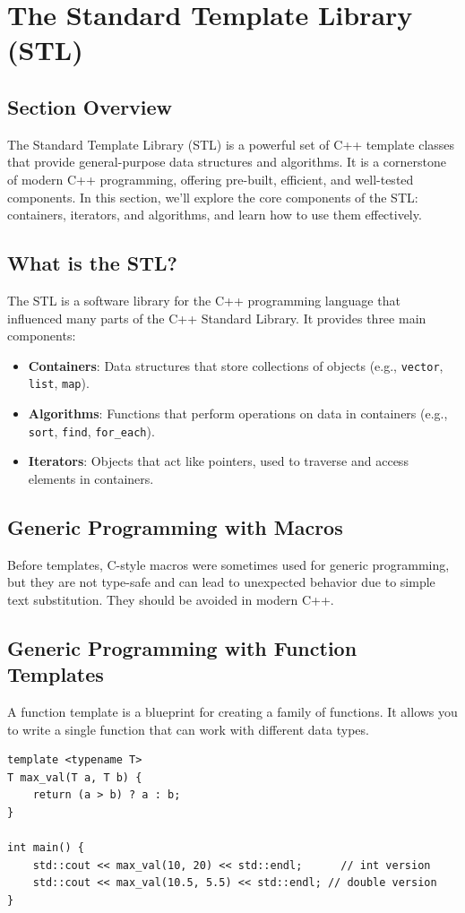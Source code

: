 \section{The Standard Template Library (STL)}

\subsection{Section Overview}
The Standard Template Library (STL) is a powerful set of C++ template classes that provide general-purpose data structures and algorithms. It is a cornerstone of modern C++ programming, offering pre-built, efficient, and well-tested components. In this section, we'll explore the core components of the STL: containers, iterators, and algorithms, and learn how to use them effectively.

\subsection{What is the STL?}
The STL is a software library for the C++ programming language that influenced many parts of the C++ Standard Library. It provides three main components:
\begin{itemize}
    \item \textbf{Containers}: Data structures that store collections of objects (e.g., \texttt{vector}, \texttt{list}, \texttt{map}).
    \item \textbf{Algorithms}: Functions that perform operations on data in containers (e.g., \texttt{sort}, \texttt{find}, \texttt{for\_each}).
    \item \textbf{Iterators}: Objects that act like pointers, used to traverse and access elements in containers.
\end{itemize}

\subsection{Generic Programming with Macros}
Before templates, C-style macros were sometimes used for generic programming, but they are not type-safe and can lead to unexpected behavior due to simple text substitution. They should be avoided in modern C++.

\subsection{Generic Programming with Function Templates}
A function template is a blueprint for creating a family of functions. It allows you to write a single function that can work with different data types.
\begin{lstlisting}
template <typename T>
T max_val(T a, T b) {
	return (a > b) ? a : b;
}

int main() {
	std::cout << max_val(10, 20) << std::endl;      // int version
	std::cout << max_val(10.5, 5.5) << std::endl; // double version
}
\end{lstlisting}

